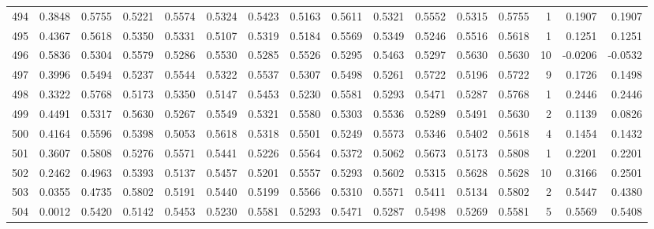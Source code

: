 \begin{tabular}{lrrrrrrrrrrrrrrr}
494 &      0.3848 &  0.5755 &  0.5221 &  0.5574 &  0.5324 &  0.5423 &  0.5163 &  0.5611 &  0.5321 &  0.5552 &   0.5315 &     0.5755 &      1 &                    0.1907 &                     0.1907 \\
495 &      0.4367 &  0.5618 &  0.5350 &  0.5331 &  0.5107 &  0.5319 &  0.5184 &  0.5569 &  0.5349 &  0.5246 &   0.5516 &     0.5618 &      1 &                    0.1251 &                     0.1251 \\
496 &      0.5836 &  0.5304 &  0.5579 &  0.5286 &  0.5530 &  0.5285 &  0.5526 &  0.5295 &  0.5463 &  0.5297 &   0.5630 &     0.5630 &     10 &                   -0.0206 &                    -0.0532 \\
497 &      0.3996 &  0.5494 &  0.5237 &  0.5544 &  0.5322 &  0.5537 &  0.5307 &  0.5498 &  0.5261 &  0.5722 &   0.5196 &     0.5722 &      9 &                    0.1726 &                     0.1498 \\
498 &      0.3322 &  0.5768 &  0.5173 &  0.5350 &  0.5147 &  0.5453 &  0.5230 &  0.5581 &  0.5293 &  0.5471 &   0.5287 &     0.5768 &      1 &                    0.2446 &                     0.2446 \\
499 &      0.4491 &  0.5317 &  0.5630 &  0.5267 &  0.5549 &  0.5321 &  0.5580 &  0.5303 &  0.5536 &  0.5289 &   0.5491 &     0.5630 &      2 &                    0.1139 &                     0.0826 \\
500 &      0.4164 &  0.5596 &  0.5398 &  0.5053 &  0.5618 &  0.5318 &  0.5501 &  0.5249 &  0.5573 &  0.5346 &   0.5402 &     0.5618 &      4 &                    0.1454 &                     0.1432 \\
501 &      0.3607 &  0.5808 &  0.5276 &  0.5571 &  0.5441 &  0.5226 &  0.5564 &  0.5372 &  0.5062 &  0.5673 &   0.5173 &     0.5808 &      1 &                    0.2201 &                     0.2201 \\
502 &      0.2462 &  0.4963 &  0.5393 &  0.5137 &  0.5457 &  0.5201 &  0.5557 &  0.5293 &  0.5602 &  0.5315 &   0.5628 &     0.5628 &     10 &                    0.3166 &                     0.2501 \\
503 &      0.0355 &  0.4735 &  0.5802 &  0.5191 &  0.5440 &  0.5199 &  0.5566 &  0.5310 &  0.5571 &  0.5411 &   0.5134 &     0.5802 &      2 &                    0.5447 &                     0.4380 \\
504 &      0.0012 &  0.5420 &  0.5142 &  0.5453 &  0.5230 &  0.5581 &  0.5293 &  0.5471 &  0.5287 &  0.5498 &   0.5269 &     0.5581 &      5 &                    0.5569 &                     0.5408 \\

\end{tabular}
